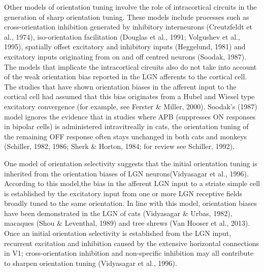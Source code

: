 Other models of orientation tuning involve the role of intracortical circuits in the generation of sharp orientation tuning. These models include processes such as cross-orientation inhibition generated by inhibitory interneurons (Creutzfeldt et al., 1974), iso-orientation facilitation (Douglas et al., 1991; Volgushev et al., 1995), spatially offset excitatory and inhibitory inputs (Heggelund, 1981) and excitatory inputs originating from on and off centred neurons (Soodak, 1987). The models that implicate the intracortical circuits also do not take into account of the weak orientation bias reported in the LGN afferents to the cortical cell. The studies that have shown orientation biases in the afferent input to the cortical cell had assumed that this bias originates from a Hubel and Wiesel type excitatory convergence (for example, see Ferster \& Miller, 2000). Soodak's (1987) model ignores the evidence that in studies where APB (suppresses ON responses in bipolar cells) is administered intravitreally in cats, the orientation tuning of the remaining OFF response often stays unchanged in both cats and monkeys (Schiller, 1982, 1986; Sherk \& Horton, 1984; for review see Schiller, 1992).

One model of orientation selectivity suggests that the initial orientation tuning is inherited from the orientation biases of LGN neurons(Vidyasagar et al., 1996). According to this model,the bias in the afferent LGN input to a striate simple cell is established by the excitatory input from one or more LGN receptive fields broadly tuned to the same orientation. In line with this model, orientation biases have been demonstrated in the LGN of cats (Vidyasagar \& Urbas, 1982), macaques (Shou \& Leventhal, 1989) and tree shrews (Van Hooser et al., 2013). Once an initial orientation selectivity is established from the LGN input, recurrent excitation and inhibition caused by the extensive horizontal connections in V1; cross-orientation inhibition and non-specific inhibition may all contribute to sharpen orientation tuning (Vidyasagar et al., 1996).


